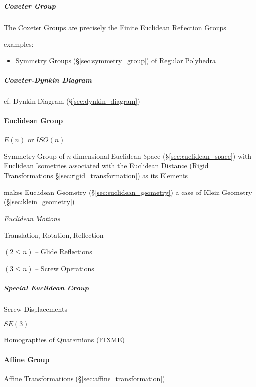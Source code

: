 \begin{itemize}
\subparagraph{Coxeter Group}\label{sec:coxeter_group}\hfill

The Coxeter Groups are precisely the Finite Euclidean Reflection Groups

examples:
\begin{itemize}
  \item Symmetry Groups (\S\ref{sec:symmetry_group}) of Regular Polyhedra
\end{itemize}




\subparagraph{Coxeter-Dynkin Diagram}\label{sec:coxeter_dynkin_diagram}\hfill

cf. Dynkin Diagram (\S\ref{sec:dynkin_diagram})



\paragraph{Euclidean Group}\label{sec:euclidean_group}\hfill

$E(n)$ or $ISO(n)$

Symmetry Group of $n$-dimensional Euclidean Space (\S\ref{sec:euclidean_space})
with Euclidean Isometries associated with the Euclidean Distance (Rigid
Transformations \S\ref{sec:rigid_transformation}) as its Elements

makes Euclidean Geometry (\S\ref{sec:euclidean_geometry}) a case of
Klein Geometry (\S\ref{sec:klein_geometry})


\emph{Euclidean Motions}

Translation, Rotation, Reflection

$(2 \leq n)$ -- Glide Reflections

$(3 \leq n)$ -- Screw Operations



\subparagraph{Special Euclidean Group}\label{sec:special_euclidean}\hfill

Screw Displacements

$SE(3)$

Homographies of Quaternions (FIXME)



\paragraph{Affine Group}\label{sec:affine_group}\hfill

Affine Transformations (\S\ref{sec:affine_transformation})


\end{itemize}
